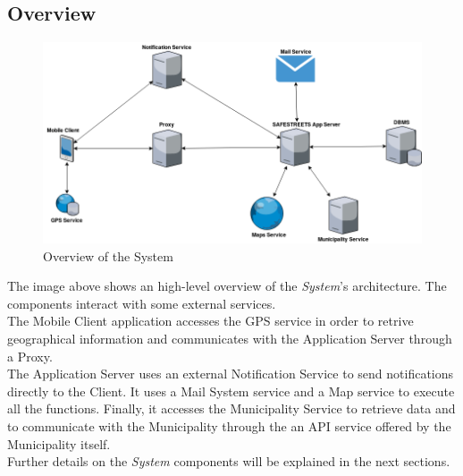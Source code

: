 \documentclass{article}
\begin{document}
	\subsection{Overview}
		\begin{figure}[H]
			\centering
			\includegraphics[scale=0.35]{Images/Diagrams/overview_diagram.png}
			\caption{Overview of the System}
		\end{figure}
	The image above shows an high-level overview of the {\it System}'s architecture.
	The components interact with some external services. \\
	The Mobile Client application accesses the GPS service in order to retrive geographical information and communicates with the Application Server through a Proxy. \\ The Application Server uses an external Notification Service to send notifications directly to the Client. It uses a Mail System service and a Map service to execute all the functions. Finally, it accesses the Municipality Service to retrieve data and to communicate with the Municipality through the an API service offered by the Municipality itself.\\ 
	Further details on the {\it System} components will be explained in the next sections. 		
	\pagebreak	
	
\end{document}
